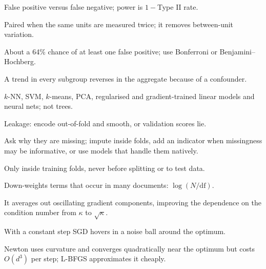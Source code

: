 {	 False positive versus false negative; power is $1-$Type II rate.

	 Paired when the same units are measured twice; it removes between-unit variation.

	 About a 64\% chance of at least one false positive; use Bonferroni or Benjamini--Hochberg.

	 A trend in every subgroup reverses in the aggregate because of a confounder.

	 $k$-NN, SVM, $k$-means, PCA, regularised and gradient-trained linear models and
	neural nets; not trees.

	 Leakage: encode out-of-fold and smooth, or validation scores lie.

	 Ask why they are missing; impute inside folds, add an indicator when missingness may be
	informative, or use models that handle them natively.

	 Only inside training folds, never before splitting or to test data.

	 Down-weights terms that occur in many documents: $\log(N/\text{df})$.

	 It averages out oscillating gradient components, improving the dependence on the
	condition number from $\kappa$ to $\sqrt\kappa$.

	 With a constant step SGD hovers in a noise ball around the optimum.

	 Newton uses curvature and converges quadratically near the optimum but costs
	$O(d^3)$ per step; L-BFGS approximates it cheaply.
}
